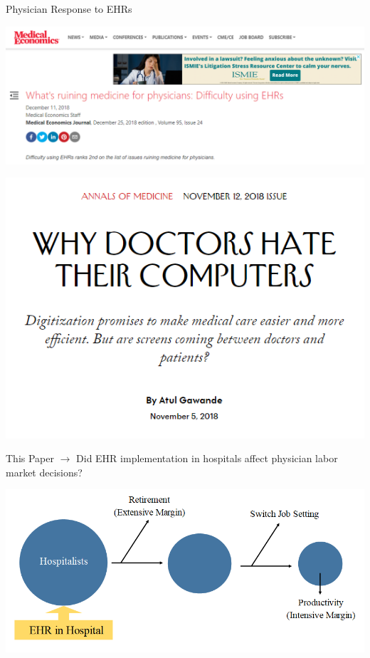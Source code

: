 \documentclass[10pt]{beamer}
\begin{document}
\begin{frame}{Physician Response to EHRs}
\begin{center}
    \includegraphics[scale=.3]{graphics/News Clip3.PNG}
    
    \vspace{3mm}
    
    \includegraphics[scale=.3]{graphics/News Clip2.PNG}
\end{center}
\end{frame}




\begin{frame}{This Paper}
$\rightarrow$ Did EHR implementation in hospitals affect physician labor market decisions?

\vspace{5mm}
\centering
\includegraphics[scale=.45]{Objects/EHR_FlowChart_General.PNG}
\end{frame}
\end{document}
